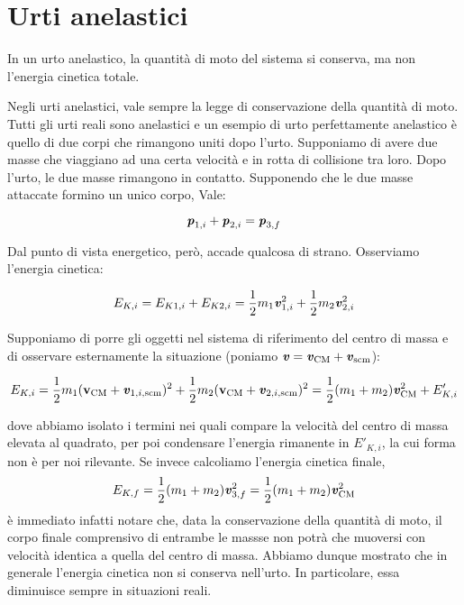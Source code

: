 \section{Urti anelastici}
\begin{tcolorbox}[colback = yellow!30, colframe = yellow!30!black, title = {Urto anelastico}]
    In un urto anelastico, la quantità di moto del sistema si conserva,
    ma non l'energia cinetica totale.
\end{tcolorbox}
\vspace{5pt}

\noindent Negli urti anelastici, vale sempre la legge di conservazione della quantità
di moto. Tutti gli urti reali sono anelastici e un esempio di urto perfettamente
anelastico è quello di due corpi che rimangono uniti dopo l'urto. Supponiamo di avere due masse che viaggiano ad una certa velocità
e in rotta di collisione tra loro. Dopo l'urto, le due masse rimangono
in contatto. Supponendo che le due masse attaccate formino un unico corpo, Vale:

\[ \textbf{\textit{p}}_{1,i} + \textbf{\textit{p}}_{2,i} = \textbf{\textit{p}}_{3,f} \]

\noindent Dal punto di vista energetico, però, accade qualcosa di strano. Osserviamo
l'energia cinetica:

\[ E_{K,i} = E_{K1, i} + E_{K2, i} = \frac12 m_1\textbf{\textit{v}}_{1,i}^2 + \frac12 m_2\textbf{\textit{v}}_{2,i}^2\]

\noindent Supponiamo di porre gli oggetti nel sistema di riferimento del centro di massa
e di osservare esternamente la situazione (poniamo $\textbf{\textit{v}} = \textbf{\textit{v}}_\text{CM} + \textbf{\textit{v}}_\text{scm}$):

\[ E_{K,i} = \frac12 m_1(\textbf{v}_\text{CM} + \textbf{\textit{v}}_{1,i,\text{scm}})^2 + \frac12 m_2(\textbf{v}_\text{CM} + \textbf{\textit{v}}_{2,i,\text{scm}})^2 = \frac12(m_1 + m_2)\textbf{\textit{v}}_\text{CM}^2 + E'_{K,i} \]

\noindent dove abbiamo isolato i termini nei quali compare la velocità del centro di massa
elevata al quadrato, per poi condensare l'energia rimanente in $E'_{K,i}$,
la cui forma non è per noi rilevante. Se invece calcoliamo l'energia cinetica
finale,
\[ E_{K,f} = \frac12 (m_1 + m_2)\textbf{\textit{v}}_{3,f}^2 = \frac12(m_1 + m_2)\textbf{\textit{v}}_\text{CM}^2 \]
è immediato infatti notare che, data la conservazione della quantità di moto,
il corpo finale comprensivo di entrambe le massse non potrà che muoversi
con velocità identica a quella del centro di massa.
Abbiamo dunque mostrato che in generale l'energia cinetica non si conserva nell'urto.
In particolare, essa diminuisce sempre in situazioni reali.

